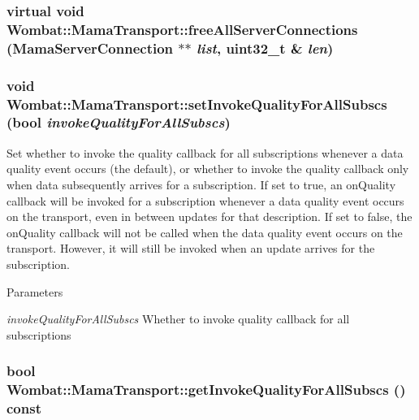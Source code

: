 \label{classWombat_1_1MamaTransport_a920be68f58b955170dc81e6386d4526c}
\hypertarget{classWombat_1_1MamaTransport_adacd2b2e6099a953a6bcbcb1bdc82d72}{
\subsubsection[{freeAllServerConnections}]{\setlength{\rightskip}{0pt plus 5cm}virtual void Wombat::MamaTransport::freeAllServerConnections ({\bf MamaServerConnection} $\ast$$\ast$ {\em list}, \/  uint32\_\-t \& {\em len})}}
\label{classWombat_1_1MamaTransport_adacd2b2e6099a953a6bcbcb1bdc82d72}
\hypertarget{classWombat_1_1MamaTransport_a1efdee7be7733e29fb2b5370bc3b308f}{
\subsubsection[{setInvokeQualityForAllSubscs}]{\setlength{\rightskip}{0pt plus 5cm}void Wombat::MamaTransport::setInvokeQualityForAllSubscs (bool {\em invokeQualityForAllSubscs})}}
\label{classWombat_1_1MamaTransport_a1efdee7be7733e29fb2b5370bc3b308f}


Set whether to invoke the quality callback for all subscriptions whenever a data quality event occurs (the default), or whether to invoke the quality callback only when data subsequently arrives for a subscription. If set to true, an onQuality callback will be invoked for a subscription whenever a data quality event occurs on the transport, even in between updates for that description. If set to false, the onQuality callback will not be called when the data quality event occurs on the transport. However, it will still be invoked when an update arrives for the subscription.


\begin{DoxyParams}{Parameters}
\item[{\em invokeQualityForAllSubscs}]Whether to invoke quality callback for all subscriptions \end{DoxyParams}
\hypertarget{classWombat_1_1MamaTransport_a7fd3c55538005d9206dcd8fe33117e74}{
\subsubsection[{getInvokeQualityForAllSubscs}]{\setlength{\rightskip}{0pt plus 5cm}bool Wombat::MamaTransport::getInvokeQualityForAllSubscs () const}}
\label{classWombat_1_1MamaTransport_a7fd3c55538005d9206dcd8fe33117e74}


